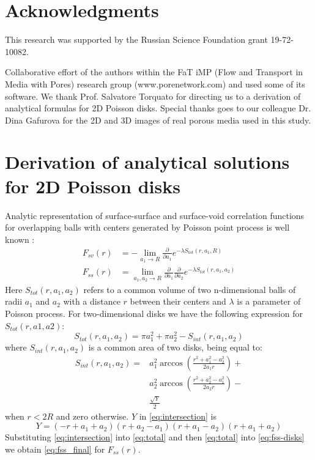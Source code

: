 \documentclass[reprint,amsmath,amssymb,aps,pre,showkeys,showpacs]{revtex4-1}
\begin{document}
\section{Acknowledgments}
This research was supported by the Russian Science Foundation grant
19-72-10082.

Collaborative effort of the authors within the FaT iMP (Flow and Transport in
Media with Pores) research group (www.porenetwork.com) and used some of its
software. We thank Prof. Salvatore Torquato for directing us to a
derivation of analytical formulas for 2D Poisson disks. Special thanks goes to
our colleague Dr. Dina Gafurova for the 2D and 3D images of real porous media
used in this study.

\appendix
\section{Derivation of analytical solutions for 2D Poisson disks}
\label{ap:overlapping-disks}
Analytic representation of surface-surface and surface-void correlation
functions for overlapping balls with centers generated by Poisson point process
is well known \cite{Torquato_book}:
\begin{align}
  F_{sv}(r) &= -\lim_{a_1 \rightarrow R} \frac{\partial}{\partial a_1}
  e^{-\lambda S_{tot}(r, a_1, R)} \label{eq:fsv-disks} \\
  F_{ss}(r) &= \lim_{a_1, a_2 \rightarrow R} \frac{\partial}{\partial a_1}
  \frac{\partial}{\partial a_2} e^{-\lambda S_{tot}(r, a_1,
    a_2)} \label{eq:fss-disks}
\end{align}
Here $S_{tot}(r, a_1, a_2)$ refers to a common volume of two n-dimensional balls
of radii $a_1$ and $a_2$ with a distance $r$ between their centers and $\lambda$
is a parameter of Poisson process. For two-dimensional disks we have the
following expression for $S_{tot}(r, a1, a2)$:
\begin{equation}
  S_{tot}(r, a_1, a_2) = \pi a_1^2 + \pi a_2^2 - S_{int}(r, a_1, a_2) \label{eq:total}
\end{equation}
where $S_{int}(r, a_1, a_2)$ is a common area of two disks, being equal to:
\begin{align}
  S_{int}(r, a_1, a_2) =&  a_1^2 \arccos(\frac{r^2+a_1^2-a_2^2}{2a_1r}) + \\
  & a_2^2 \arccos(\frac{r^2+a_2^2-a_1^2}{2a_2r}) - \\
  & \frac{\sqrt{Y}}{2} \label{eq:intersection}
\end{align}
when $r<2R$ and zero otherwise. $Y$ in \cref{eq:intersection} is
\begin{equation*}
  Y = (-r+a_1+a_2)(r+a_2-a_1)(r+a_1-a_2)(r+a_1+a_2)
\end{equation*}
Substituting \cref{eq:intersection} into \cref{eq:total} and then
\cref{eq:total} into \cref{eq:fss-disks} we obtain \cref{eq:fss_final} for
$F_{ss}(r)$.
\end{document}

